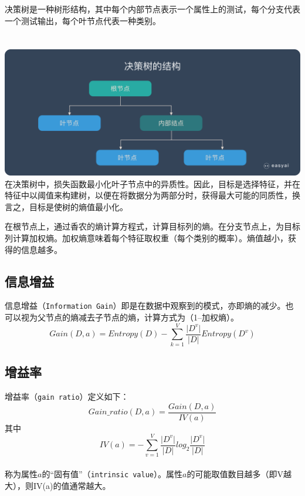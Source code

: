\documentclass[lang=cn,11pt]{elegantpaper}
\begin{document}
决策树是一种树形结构，其中每个内部节点表示一个属性上的测试，每个分支代表一个测试输出，每个叶节点代表一种类别。\\
\\~
\includegraphics[scale=0.3]{tree.png}\\

在决策树中，损失函数最小化叶子节点中的异质性。因此，目标是选择特征，并在特征中以阈值来构建树，以便在将数据分为两部分时，获得最大可能的同质性，换言之，目标是使树的熵值最小化。

在根节点上，通过香农的熵计算方程式，计算目标列的熵。在分支节点上，为目标列计算加权熵。加权熵意味着每个特征取权重（每个类别的概率）。熵值越小，获得的信息越多。

\subsection{信息增益}
信息增益（\lstinline{Information Gain}）即是在数据中观察到的模式，亦即熵的减少。也可以视为父节点的熵减去子节点的熵，计算方式为（1–加权熵）。
\begin{equation}
Gain(D,a) = Entropy(D) - \sum_{k = 1}^{V} \frac{\lvert D^v \rvert}{\lvert D \rvert} Entropy(D^v)   \label{eq:binom}
\end{equation}

\subsection{增益率}
增益率（\lstinline{gain ratio}）定义如下：
\begin{equation}
Gain\_ ratio(D,a) = \frac{Gain(D,a)}{IV(a)} \label{eq:binom}
\end{equation}
其中
\begin{equation}
IV(a) = -\sum_{v = 1}^{V} \frac{\lvert D^v \rvert}{\lvert D \rvert} log_2 \frac{\lvert D^v \rvert}{\lvert D \rvert}  \label{eq:binom}
\end{equation}\\
称为属性$a$的“固有值”（\lstinline{intrinsic value}）。属性$a$的可能取值数目越多（即V越大），则IV(a)的值通常越大。
\end{document}
